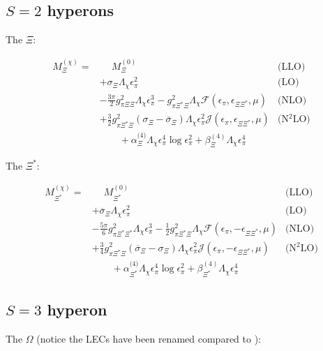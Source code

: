 \documentclass[12pt,tightenlines, raggedbottom, prd, notitlepage]{revtex4-1}
\begin{document}
\subsection{$S=2$ hyperons}

The $\Xi$:

\begin{align*}
M_\Xi^{(\chi)} = &\phantom{+}  M_\Xi^{(0)} & \text{(LLO)} \\
&+ \sigma_\Xi \Lambda_\chi \epsilon_\pi^2 & \text{(LO)} \\
&- \frac{3\pi}{2} g_{\pi\Xi\Xi}^2 \Lambda_{\chi} \epsilon_\pi^3
- g_{\pi\Xi^*\Xi}^2 \Lambda_{\chi} \mathcal{F}(\epsilon_\pi, \epsilon_{\Xi\Xi^*}, \mu) & \text{(NLO)} \\
&+ \frac{3}{2} g_{\pi\Xi^*\Xi}^2 (\sigma_\Xi - \overline{\sigma}_\Xi ) \Lambda_\chi \epsilon_\pi^2 
\mathcal{J} (\epsilon_\pi, \epsilon_{\Xi\Xi^*}, \mu) &\text{(N$^2$LO)} \\
&\qquad + \alpha_\Xi^\text{(4)} \Lambda_{\chi} \epsilon_\pi^4 \log{\epsilon_\pi^2} + \beta_{\Xi}^{(4)} \Lambda_\chi \epsilon_\pi^4
\end{align*}

The $\Xi^*$:

\begin{align*}
M_{\Xi^*}^{(\chi)} = &\phantom{+}  M_{\Xi^*}^{(0)} & \text{(LLO)} \\
&+ \overline{\sigma}_\Xi \Lambda_\chi \epsilon_\pi^2 & \text{(LO)} \\
&- \frac{5\pi}{6} g_{\pi\Xi^*\Xi^*}^2 \Lambda_{\chi} \epsilon_\pi^3
- \frac{1}{2} g_{\pi\Xi^*\Xi}^2 \Lambda_{\chi} \mathcal{F}(\epsilon_\pi, -\epsilon_{\Xi\Xi^*}, \mu) & \text{(NLO)} \\
&+ \frac{3}{4} g_{\pi\Xi^*\Xi}^2 (\overline{\sigma}_\Xi -\sigma_\Xi ) \Lambda_\chi \epsilon_\pi^2 
\mathcal{J} (\epsilon_\pi, -\epsilon_{\Xi\Xi^*}, \mu) &\text{(N$^2$LO)} \\
&\qquad + \alpha_{\Xi^*}^\text{(4)} \Lambda_{\chi} \epsilon_\pi^4 \log{\epsilon_\pi^2} + \beta_{\Xi^*}^{(4)} \Lambda_\chi \epsilon_\pi^4
\end{align*}

\subsection{$S=3$ hyperon}

The $\Omega$ (notice the LECs have been renamed compared to \cite{Tiburzi:2008bk}):
\end{document}
